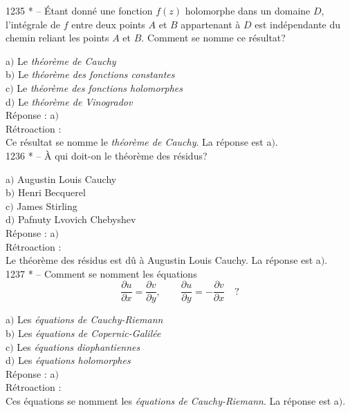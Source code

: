 ﻿\documentclass[letterpaper, 12pt]{article}
\begin{document}
1235 * -- \'Etant donn\'e une fonction $f(z)$ holomorphe dans un
domaine $D$, l'int\'egrale de $f$ entre deux points $A$ et $B$
appartenant \`a $D$ est ind\'ependante du chemin reliant les points
$A$ et $B$. Comment se nomme ce r\'esultat?

a$)$ Le {\sl th\'eor\`eme de Cauchy} \\
b$)$ Le {\sl th\'eor\`eme des fonctions constantes} \\
c$)$ Le {\sl th\'eor\`eme des fonctions holomorphes} \\
d$)$ Le {\sl th\'eor\`eme de Vinogradov}\\

R\'eponse : a$)$\\

R\'etroaction : \\
Ce r\'esultat se nomme le {\sl th\'eor\`eme de Cauchy}.
La r\'eponse est a$)$.\\

1236 * -- \`A qui doit-on le th\'eor\`eme des r\'esidus?

a$)$ Augustin Louis Cauchy \\
b$)$ Henri Becquerel \\
c$)$ James Stirling \\
d$)$ Pafnuty Lvovich Chebyshev\\

R\'eponse : a$)$\\

R\'etroaction : \\
Le th\'eor\`eme des r\'esidus est d\^u \`a Augustin Louis Cauchy.
La r\'eponse est a$)$.\\

1237 * -- Comment se nomment les \'equations
$$\displaystyle{\frac{\partial u}{\partial x}=\frac{\partial v}{\partial
y},\quad\quad\frac{\partial u}{\partial y}=-\frac{\partial v}{\partial
x}}\quad?$$

a$)$ Les {\sl \'equations de Cauchy-Riemann} \\
b$)$ Les {\sl \'equations de Copernic-Galil\'ee} \\
c$)$ Les {\sl \'equations diophantiennes} \\
d$)$ Les {\sl \'equations holomorphes}\\

R\'eponse : a$)$\\

R\'etroaction : \\
Ces \'equations se nomment les {\sl \'equations de Cauchy-Riemann}.
La r\'eponse est a$)$.\\
\end{document}
